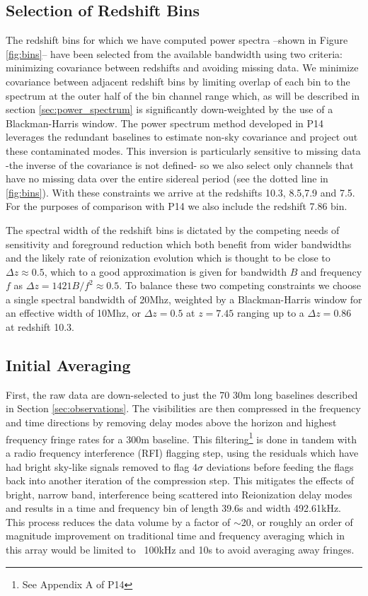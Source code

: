 \documentclass[preprint]{aastex}
\begin{document}
\subsection{Selection of Redshift Bins}
The redshift bins for which we have computed power spectra --shown in Figure \ref{fig:bins}-- have been selected from the available bandwidth using two criteria: minimizing covariance between redshifts and avoiding missing data. We minimize covariance between adjacent redshift bins by limiting overlap of each bin to the spectrum at the outer half of the bin channel range which, as will be described in section \ref{sec:power_spectrum} is significantly down-weighted by the use of a Blackman-Harris window.   The power spectrum method developed in P14 leverages the redundant baselines to estimate non-sky covariance and project out these contaminated modes. This inversion is particularly sensitive to missing data -the inverse of the covariance is not defined- so we also select only channels that have no missing data over the entire sidereal period (see the dotted line in \ref{fig:bins}).  With these constraints we arrive at the redshifts 10.3, 8.5,7.9 and 7.5.  For the purposes of comparison with P14 we also include the redshift 7.86 bin.

The spectral width of the redshift bins is dictated by the competing needs of sensitivity and foreground reduction which both benefit from wider bandwidths and the likely rate of reionization evolution which is thought to be close to $\Delta z \approx 0.5$, which to a good approximation is given for bandwidth $B$ and frequency $f$ as $\Delta z=1421 B/f^2\approx 0.5$. To balance these two competing constraints we choose a single spectral bandwidth of 20Mhz, weighted by a Blackman-Harris window for an effective width of 10Mhz, or $\Delta z=0.5$ at $z=7.45$ ranging up to a $\Delta z = 0.86$ at redshift 10.3.




\subsection{Initial Averaging}
  First, the raw data are down-selected to just the 70 30m long baselines described in Section \ref{sec:observations}.  %
   The visibilities are then compressed in the frequency and time directions by removing delay modes above the horizon and highest frequency fringe rates for a 300m baseline.  This filtering\footnote{See Appendix A of P14} is done in tandem with a radio frequency interference (RFI) flagging step, using the residuals which have had bright sky-like signals removed to flag 4$\sigma$ deviations before feeding the flags back into another iteration of the compression step. This mitigates the effects of bright, narrow band, interference  being scattered into Reionization delay modes and results in a time and frequency bin of length 39.6s and width 492.61kHz. 
  This process reduces the data volume by a factor of $\sim$20, or roughly an order of magnitude improvement on traditional time and frequency averaging which in this array would be limited to ~100kHz and 10s to avoid averaging away fringes.
  
\end{document}
